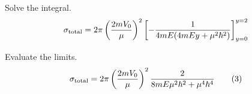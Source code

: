 Solve the integral.
\begin{equation*}
\sigma_{\rm total}=2\pi\left(\frac{2mV_0}{\mu}\right)^2
\left[-\frac{1}{4mE(4mEy+\mu^2\hbar^2)}\right]_{y=0}^{y=2}
\end{equation*}

Evaluate the limits.
\begin{equation*}
\sigma_{\rm total}=2\pi\left(\frac{2mV_0}{\mu}\right)^2
\frac{2}{8mE\mu^2\hbar^2+\mu^4\hbar^4}
\tag{3}
\end{equation*}


